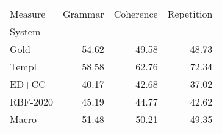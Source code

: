 \begin{tabular}{lrrr}
\toprule
Measure & Grammar & Coherence & Repetition \\
System &  &  &  \\
\midrule
Gold & 54.62 & 49.58 & 48.73 \\
Templ & 58.58 & 62.76 & 72.34 \\
ED+CC & 40.17 & 42.68 & 37.02 \\
RBF-2020 & 45.19 & 44.77 & 42.62 \\
Macro & 51.48 & 50.21 & 49.35 \\
\bottomrule
\end{tabular}
